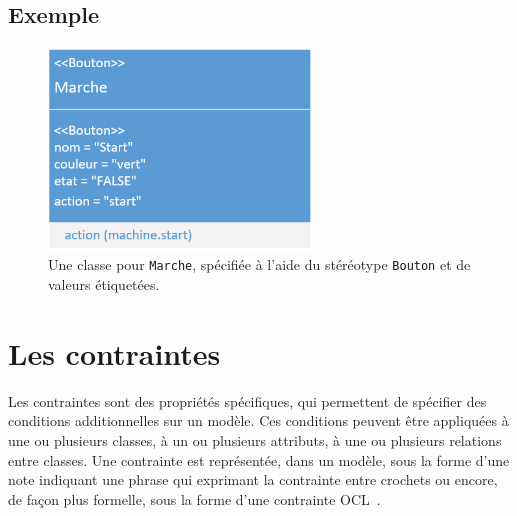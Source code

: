 \subsection*{Exemple}
%
\begin{figure}[H]
    \begin{center}
    \includegraphics[width=7cm]{10_img/chap4/start.PNG}
    \caption[Une classe pour \texttt{Marche}, spécifiée à l'aide du stéréotype \texttt{Bouton}.]{Une classe pour \texttt{Marche}, spécifiée à l'aide du stéréotype \texttt{Bouton} et de valeurs \'etiquet\'ees.}
    \label{fig.uml_marche}
    \end{center}
\end{figure}






\section{Les contraintes}
Les contraintes sont des propriétés spécifiques, qui permettent de sp\'ecifier des conditions additionnelles sur un modèle.
Ces conditions peuvent être appliquées à une ou plusieurs classes, à un ou plusieurs attributs, à une ou plusieurs relations entre classes.
Une contrainte est représent\'ee, dans un modèle, sous la forme d'une note indiquant une phrase qui exprimant la contrainte entre crochets ou encore, de fa\c{c}on plus formelle, sous la forme d'une contrainte OCL~\cite{OCL}.

